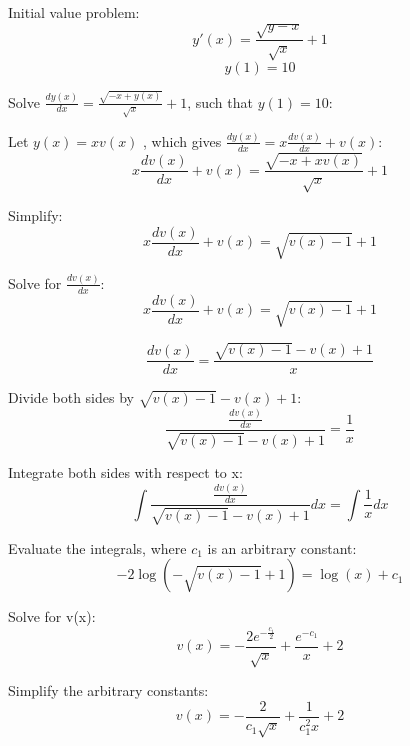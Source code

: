 \documentclass[12pt,letterpaper]{article}
\begin{document}
Initial value problem:
\begin{equation}
     y'(x) = \frac {\sqrt {y - x}}{\sqrt{x}} + 1
\end{equation}
\begin{equation}
     y(1) = 10
\end{equation}


Solve $ \frac{dy(x)}{ dx} = \frac {\sqrt{-x + y(x)}}{ \sqrt{x}} + 1$, such that $y(1) = 10$:

Let $ y(x) = xv(x)$ , which gives $ \frac{dy(x)}{dx} = x \frac{ dv(x)}{ dx} + v(x)$:
\begin{equation}
     x \frac{ dv(x)}{ dx} + v(x) = \frac{\sqrt{-x + x v(x)}}{\sqrt{x}} + 1
\end{equation}

Simplify:
\begin{equation}
     x \frac{ dv(x)}{ dx} + v(x) = \sqrt{v(x) - 1} + 1
\end{equation}

Solve for $\frac{dv(x)}{dx}$:
\begin{equation}
     x \frac{ dv(x)}{ dx} + v(x) = \sqrt{v(x) - 1} + 1
\end{equation}

\begin{equation}
     \frac{ dv(x)}{ dx} = \frac{ \sqrt{v(x) - 1} - v(x) + 1}{x}
\end{equation}

Divide both sides by $\sqrt{v(x) - 1} - v(x) + 1$:
\begin{equation}
     \frac{\frac{ dv(x)}{ dx}}{\sqrt{v(x) - 1} - v(x) + 1} = \frac{1}{x}
\end{equation}

Integrate both sides with respect to x:
\begin{equation}
    \int {
    \frac{\frac{ dv(x)}{ dx}}{\sqrt{v(x) - 1} - v(x) + 1}
    }dx = \int {\frac{1}{x}}dx
\end{equation}

Evaluate the integrals, where $c_1$ is an arbitrary constant:
\begin{equation}
     -2\log (-\sqrt{v(x) - 1} + 1) = \log (x) + c_1
\end{equation}

Solve for v(x):
\begin{equation}
     v(x) = - \frac{2e^{-\frac{c_1}{2}}}{\sqrt{x}} + \frac{e^{-c_1}}{x} + 2
\end{equation}

Simplify the arbitrary constants:
\begin{equation}
     v(x) = - \frac{2}{c_1\sqrt{x}} + \frac{1}{c_1^2x} + 2
\end{equation}
\end{document}
